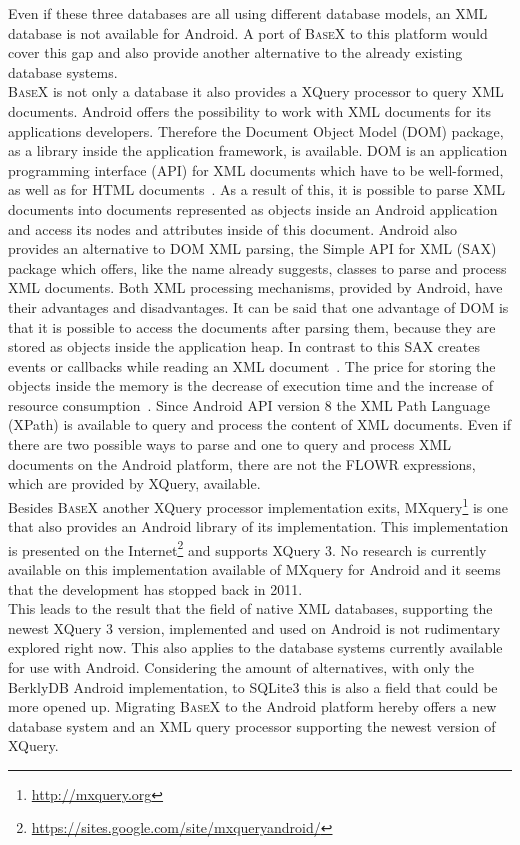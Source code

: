 Even if these three databases are all using different database models, an XML database is not available for Android. 
A port of \textsc{BaseX} to this platform would cover this gap and also provide another alternative to the already existing database systems.\\
\textsc{BaseX} is not only a database it also provides a XQuery processor to query XML documents.
Android offers the possibility to work with XML documents for its applications developers.
Therefore the Document Object Model (DOM) package, as a library inside the application framework, is available.
DOM is an application programming interface (API) for XML documents which have to be well-formed, as well as for HTML documents~\cite{nicol2001document}.
As a result of this, it is possible to parse XML documents into documents represented as objects inside an Android application and access its nodes and attributes inside of this document.
Android also provides an alternative to DOM XML parsing, the Simple API for XML (SAX) package which offers, like the name already suggests, classes to parse and process XML documents.
Both XML processing mechanisms, provided by Android, have their advantages and disadvantages.
It can be said that one advantage of DOM is that it is possible to access the documents after parsing them, because they are stored as objects inside the application heap.
In contrast to this SAX creates events or callbacks while reading an XML document~\cite{roy2001xml}.
The price for storing the objects inside the memory is the decrease of execution time and the increase of resource consumption~\cite{chenextracting}.
Since Android API version 8 the XML Path Language (XPath) is available to query and process the content of XML documents.
Even if there are two possible ways to parse and one to query and process XML documents on the Android platform, there are not the FLOWR expressions, which are provided by XQuery, available.\\
Besides \textsc{BaseX} another XQuery processor implementation exits, MXquery\footnote{\url{http://mxquery.org}} is one that also provides an Android library of its implementation.
This implementation is presented on the Internet\footnote{\url{https://sites.google.com/site/mxqueryandroid/}} and supports XQuery 3.
No research is currently available on this implementation available of MXquery for Android and it seems that the development has stopped back in 2011.\\
This leads to the result that the field of native XML databases, supporting the newest XQuery 3 version, implemented and used on Android is not rudimentary explored right now.
This also applies to the database systems currently available for use with Android.
Considering the amount of alternatives, with only the BerklyDB Android implementation, to SQLite3 this is also a field that could be more opened up.
Migrating \textsc{BaseX} to the Android platform hereby offers a new database system and an XML query processor supporting the newest version of XQuery.

